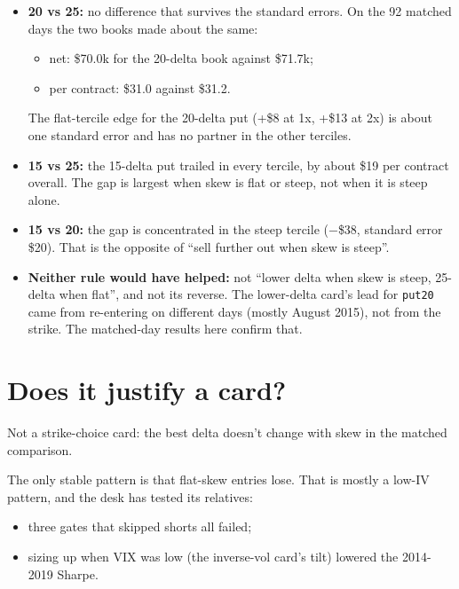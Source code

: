 \documentclass{article}
\begin{document}
\begin{itemize}

\item \textbf{20 vs 25:} no difference that survives the standard errors. On the 92 matched days the two books made about the same:

\begin{itemize}

\item net: \$70.0k for the 20-delta book against \$71.7k;

\item per contract: \$31.0 against \$31.2.

\end{itemize}

The flat-tercile edge for the 20-delta put (+\$8 at 1x, +\$13 at 2x) is about one standard error and has no partner in the other terciles.

\item \textbf{15 vs 25:} the 15-delta put trailed in every tercile, by about \$19 per contract overall. The gap is largest when skew is flat or steep, not when it is steep alone.

\item \textbf{15 vs 20:} the gap is concentrated in the steep tercile (\ensuremath{-}\$38, standard error \$20). That is the opposite of ``sell further out when skew is steep''.

\item \textbf{Neither rule would have helped:} not ``lower delta when skew is steep, 25-delta when flat'', and not its reverse. The lower-delta card's lead for \texttt{put20} came from re-entering on different days (mostly August 2015), not from the strike. The matched-day results here confirm that.

\end{itemize}

\section{Does it justify a card?}

Not a strike-choice card: the best delta doesn't change with skew in the matched comparison.

The only stable pattern is that flat-skew entries lose. That is mostly a low-IV pattern, and the desk has tested its relatives:

\begin{itemize}

\item three gates that skipped shorts all failed;

\item sizing up when VIX was low (the inverse-vol card's tilt) lowered the 2014-2019 Sharpe.

\end{itemize}
\end{document}
